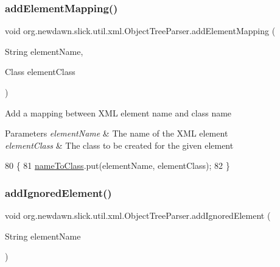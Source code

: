 \subsubsection{\texorpdfstring{add\+Element\+Mapping()}{addElementMapping()}}
{\footnotesize\ttfamily void org.\+newdawn.\+slick.\+util.\+xml.\+Object\+Tree\+Parser.\+add\+Element\+Mapping (\begin{DoxyParamCaption}\item[{String}]{element\+Name,  }\item[{Class}]{element\+Class }\end{DoxyParamCaption})\hspace{0.3cm}{\ttfamily [inline]}}

Add a mapping between X\+ML element name and class name


\begin{DoxyParams}{Parameters}
{\em element\+Name} & The name of the X\+ML element \\
\hline
{\em element\+Class} & The class to be created for the given element \\
\hline
\end{DoxyParams}

\begin{DoxyCode}
80                                                                           \{
81         \mbox{\hyperlink{classorg_1_1newdawn_1_1slick_1_1util_1_1xml_1_1_object_tree_parser_ac81f61688951ebf234982da046b22dd9}{nameToClass}}.put(elementName, elementClass);
82     \}
\end{DoxyCode}
\mbox{\label{classorg_1_1newdawn_1_1slick_1_1util_1_1xml_1_1_object_tree_parser_a309e9f0ca0c24b6cb4120da36f3ddf9d}} 
\subsubsection{\texorpdfstring{add\+Ignored\+Element()}{addIgnoredElement()}}
{\footnotesize\ttfamily void org.\+newdawn.\+slick.\+util.\+xml.\+Object\+Tree\+Parser.\+add\+Ignored\+Element (\begin{DoxyParamCaption}\item[{String}]{element\+Name }\end{DoxyParamCaption})\hspace{0.3cm}{\ttfamily [inline]}}

